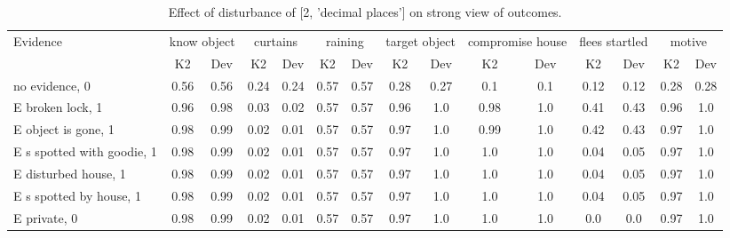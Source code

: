 \begin{table}\begin{tabular}{l|cc|cc|cc|cc|cc|cc|cc}\toprule\multirow{2}{*}{Evidence} & \multicolumn{2}{c}{know object}& \multicolumn{2}{c}{curtains}& \multicolumn{2}{c}{raining}& \multicolumn{2}{c}{target object}& \multicolumn{2}{c}{compromise house}& \multicolumn{2}{c}{flees startled}& \multicolumn{2}{c}{motive}\\& {K2} & {Dev}& {K2} & {Dev}& {K2} & {Dev}& {K2} & {Dev}& {K2} & {Dev}& {K2} & {Dev}& {K2} & {Dev}\\\midrule
no evidence, 0 & 0.56&0.56&0.24&0.24&0.57&0.57&0.28&0.27&0.1&0.1&0.12&0.12&0.28&0.28\\E broken lock, 1 & 0.96&0.98&0.03&0.02&0.57&0.57&0.96&1.0&0.98&1.0&0.41&0.43&0.96&1.0\\E object is gone, 1 & 0.98&0.99&0.02&0.01&0.57&0.57&0.97&1.0&0.99&1.0&0.42&0.43&0.97&1.0\\E s spotted with goodie, 1 & 0.98&0.99&0.02&0.01&0.57&0.57&0.97&1.0&1.0&1.0&0.04&0.05&0.97&1.0\\E disturbed house, 1 & 0.98&0.99&0.02&0.01&0.57&0.57&0.97&1.0&1.0&1.0&0.04&0.05&0.97&1.0\\E s spotted by house, 1 & 0.98&0.99&0.02&0.01&0.57&0.57&0.97&1.0&1.0&1.0&0.04&0.05&0.97&1.0\\E private, 0 & 0.98&0.99&0.02&0.01&0.57&0.57&0.97&1.0&1.0&1.0&0.0&0.0&0.97&1.0\\\bottomrule\end{tabular}\caption{Effect of disturbance of [2, 'decimal places'] on strong view of outcomes.}\end{table}